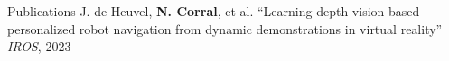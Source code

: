 \begin{rubric}{Publications}
\entry*[] J. de Heuvel, \textbf{N. Corral}, et al. “Learning depth vision-based personalized robot navigation from dynamic demonstrations in virtual reality” \textit{IROS}, 2023 \newline
\end{rubric}
